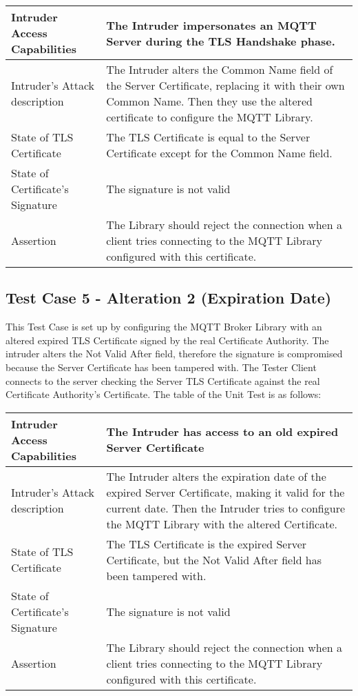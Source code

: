 \documentclass[binding=0.6cm,noexaminfo]{sapthesis}
\begin{document}
\begin{center}
\begin{tabular}{| p{6cm} | p{6cm} |}
\hline
Intruder Access Capabilities & The Intruder impersonates an MQTT Server during the TLS Handshake phase. \\
\hline
Intruder’s Attack description & The Intruder alters the Common Name field of the Server Certificate, replacing it with their own Common Name. Then they use the altered certificate to configure the MQTT Library. \\
\hline
State of TLS Certificate & The TLS Certificate is equal to the Server Certificate except for the Common Name field. \\
\hline
State of Certificate’s Signature & The signature is not valid \\
\hline
Assertion & The Library should reject the connection when a client tries connecting to the MQTT Library configured with this certificate. \\
\hline
\end{tabular}
\end{center}

\subsection{Test Case 5 - Alteration 2 (Expiration Date)}
This Test Case is set up by configuring the MQTT Broker Library with an altered expired TLS Certificate signed by the real Certificate Authority. The intruder alters the Not Valid After field, therefore the signature is compromised because the Server Certificate has been tampered with. The Tester Client connects to the server checking the Server TLS Certificate against the real Certificate Authority’s Certificate. The table of the Unit Test is as follows:

\begin{center}
\begin{tabular}{| p{6cm} | p{6cm} |}
\hline
Intruder Access Capabilities & The Intruder has access to an old expired Server Certificate \\
\hline
Intruder’s Attack description & The Intruder alters the expiration date of the expired Server Certificate, making it valid for the current date. Then the Intruder tries  to configure the MQTT Library with the altered Certificate. \\
\hline
State of TLS Certificate & The TLS Certificate is the expired Server Certificate, but the Not Valid After field has been tampered with. \\
\hline
State of Certificate’s Signature & The signature is not valid \\
\hline
Assertion & The Library should reject the connection when a client tries connecting to the MQTT Library configured with this certificate. \\
\hline
\end{tabular}
\end{center}
\end{document}
